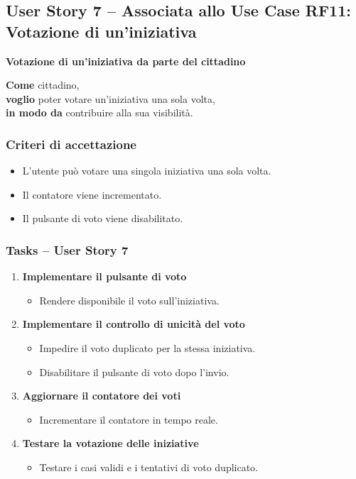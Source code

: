 \documentclass{article}
\begin{document}

\subsection{User Story 7 -- Associata allo Use Case RF11: Votazione di un'iniziativa}

\textbf{Votazione di un'iniziativa da parte del cittadino}

\textbf{Come} cittadino,\\
\textbf{voglio} poter votare un’iniziativa una sola volta,\\
\textbf{in modo da} contribuire alla sua visibilità.

\subsubsection{Criteri di accettazione}
\begin{itemize}
    \item L’utente può votare una singola iniziativa una sola volta.
    \item Il contatore viene incrementato.
    \item Il pulsante di voto viene disabilitato.
\end{itemize}

\subsubsection{Tasks -- User Story 7}
\begin{enumerate}
    \item \textbf{Implementare il pulsante di voto}
    \begin{itemize}
        \item Rendere disponibile il voto sull'iniziativa.
    \end{itemize}

    \item \textbf{Implementare il controllo di unicità del voto}
    \begin{itemize}
        \item Impedire il voto duplicato per la stessa iniziativa.
        \item Disabilitare il pulsante di voto dopo l'invio.
    \end{itemize}

    \item \textbf{Aggiornare il contatore dei voti}
    \begin{itemize}
        \item Incrementare il contatore in tempo reale.
    \end{itemize}

    \item \textbf{Testare la votazione delle iniziative}
    \begin{itemize}
        \item Testare i casi validi e i tentativi di voto duplicato.
    \end{itemize}
\end{enumerate}
\end{document}
